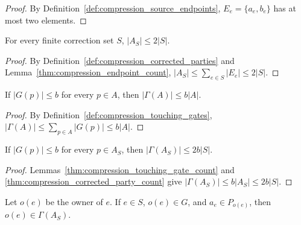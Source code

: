 \begin{proof}\leanok
    By Definition~\ref{def:compression_source_endpoints}, $E_e=\{a_e,b_e\}$ has at most two elements.
\end{proof}

\begin{lemma}
    \label{thm:compression_corrected_party_count}
    \leanok
    For every finite correction set $S$, $|A_S|\le2|S|$.
\end{lemma}

\begin{proof}\leanok
    By Definition~\ref{def:compression_corrected_parties} and Lemma~\ref{thm:compression_endpoint_count}, $|A_S|\le\sum_{e\in S}|E_e|\le2|S|$.
\end{proof}

\begin{lemma}
    \label{thm:compression_touching_gate_count}
    \leanok
    If $|G(p)|\le b$ for every $p\in A$, then $|\Gamma(A)|\le b|A|$.
\end{lemma}

\begin{proof}\leanok
    By Definition~\ref{def:compression_touching_gates}, $|\Gamma(A)|\le\sum_{p\in A}|G(p)|\le b|A|$.
\end{proof}

\begin{lemma}
    \label{thm:compression_affected_gate_count}
    \leanok
    If $|G(p)|\le b$ for every $p\in A_S$, then $|\Gamma(A_S)|\le2b|S|$.
\end{lemma}

\begin{proof}\leanok
    Lemmas~\ref{thm:compression_touching_gate_count} and \ref{thm:compression_corrected_party_count} give $|\Gamma(A_S)|\le b|A_S|\le2b|S|$.
\end{proof}

\begin{lemma}
    \label{thm:compression_corrected_owner}
    \leanok
    Let $o(e)$ be the owner of $e$. If $e\in S$, $o(e)\in G$, and $a_e\in P_{o(e)}$, then $o(e)\in\Gamma(A_S)$.
\end{lemma}

